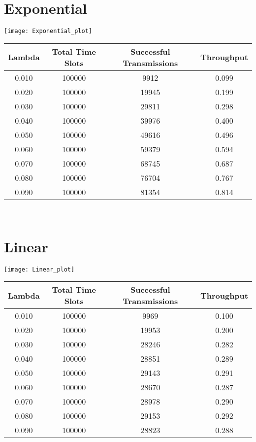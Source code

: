 \documentclass{article}
\begin{document}
\section*{Exponential}
\begin{center}
\texttt{[image: Exponential\_plot]}
\begin{tabular}{c | c | c | c}
	Lambda    & Total Time Slots & Successful Transmissions & Throughput \\
	\hline
	0.010     & 100000    & 9912      & 0.099     \\
	0.020     & 100000    & 19945     & 0.199     \\
	0.030     & 100000    & 29811     & 0.298     \\
	0.040     & 100000    & 39976     & 0.400     \\
	0.050     & 100000    & 49616     & 0.496     \\
	0.060     & 100000    & 59379     & 0.594     \\
	0.070     & 100000    & 68745     & 0.687     \\
	0.080     & 100000    & 76704     & 0.767     \\
	0.090     & 100000    & 81354     & 0.814     \\
\end{tabular} \\
\end{center}

\section*{Linear}
\begin{center}
\texttt{[image: Linear\_plot]}
\begin{tabular}{c | c | c | c}
	Lambda    & Total Time Slots & Successful Transmissions & Throughput \\
	\hline
	0.010     & 100000    & 9969      & 0.100     \\
	0.020     & 100000    & 19953     & 0.200     \\
	0.030     & 100000    & 28246     & 0.282     \\
	0.040     & 100000    & 28851     & 0.289     \\
	0.050     & 100000    & 29143     & 0.291     \\
	0.060     & 100000    & 28670     & 0.287     \\
	0.070     & 100000    & 28978     & 0.290     \\
	0.080     & 100000    & 29153     & 0.292     \\
	0.090     & 100000    & 28823     & 0.288     \\
\end{tabular} \\
\end{center}
\end{document}
